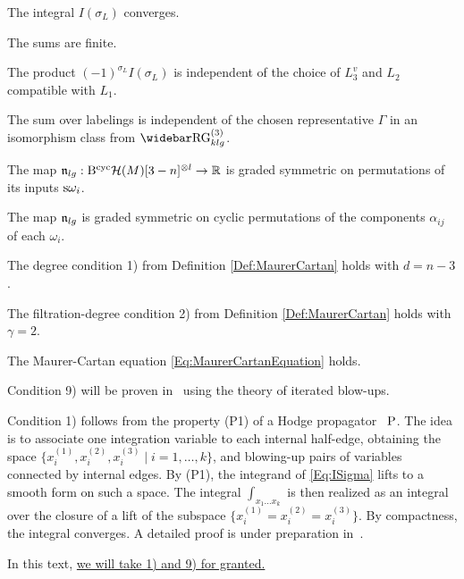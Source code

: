 \documentclass[\MainFolder/Text.tex]{subfiles}
\begin{document}
\begin{PlainList}
 \item The integral $I(\sigma_L)$ converges.
 \item The sums are finite.
 \item The product $(-1)^{\sigma_L} I(\sigma_L)$ is independent of the choice of $L_3^v$ and $L_2$ compatible with $L_1$.
 \item The sum over labelings is independent of the chosen representative $\Gamma$ in an isomorphism class from $\TRRG_{klg}$.
  \item The map $\mathfrak{n}_{lg}: \mathrm{B}^{\mathrm{cyc}}\mathcal{H}(M)[3-n]^{\otimes l} \rightarrow \mathbb{R}$ is graded symmetric on permutations of its inputs $\mathrm{s}\omega_i$.
 \item The map $\mathfrak{n}_{lg}$ is graded symmetric on cyclic permutations of the components $\alpha_{ij}$ of each $\omega_{i}$.
 \item The degree condition 1) from Definition \ref{Def:MaurerCartan} holds with $d = n-3$.
 \item The filtration-degree condition 2) from Definition \ref{Def:MaurerCartan} holds with $\gamma = 2$.
 \item The Maurer-Cartan equation \eqref{Eq:MaurerCartanEquation} holds.
\end{PlainList}

Condition 9) will be proven in~\cite{Cieliebak2018} using the theory of iterated blow-ups.

Condition 1) follows from the property (P1) of a Hodge propagator~ $\mathrm{P}$.
The idea is to associate one integration variable to each internal half-edge, obtaining the space $\{x_i^{(1)},x_i^{(2)},x_i^{(3)}\mid i=1, \dotsc, k\}$, and blowing-up pairs of variables connected by internal edges.
By (P1), the integrand of \eqref{Eq:ISigma} lifts to a smooth form on such a space.
The integral $\int_{x_1 \dotsc x_k}$ is then realized as an integral over the closure of a lift of the subspace $\{x_i^{(1)} = x_i^{(2)} = x_i^{(3)}\}$.
By compactness, the integral converges.
A detailed proof is under preparation in~\cite{Cieliebak2018}.

In this text, \underline{we will take 1) and 9) for granted.} 
\end{document}
